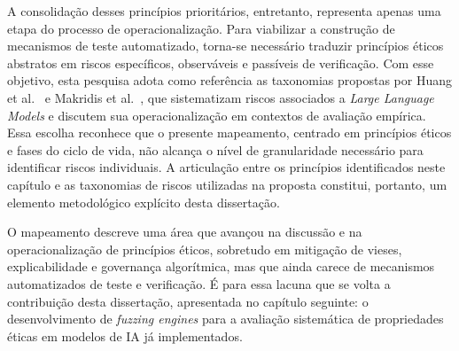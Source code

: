 A consolidação desses princípios prioritários, entretanto, representa apenas uma etapa do processo de operacionalização. Para viabilizar a construção de mecanismos de teste automatizado, torna-se necessário traduzir princípios éticos abstratos em riscos específicos, observáveis e passíveis de verificação. Com esse objetivo, esta pesquisa adota como referência as taxonomias propostas por Huang et al.~\cite{Huang2023} e Makridis et al.~\cite{Makridis2024}, que sistematizam riscos associados a \textit{Large Language Models} e discutem sua operacionalização em contextos de avaliação empírica. Essa escolha reconhece que o presente mapeamento, centrado em princípios éticos e fases do ciclo de vida, não alcança o nível de granularidade necessário para identificar riscos individuais. A articulação entre os princípios identificados neste capítulo e as taxonomias de riscos utilizadas na proposta constitui, portanto, um elemento metodológico explícito desta dissertação.

O mapeamento descreve uma área que avançou na discussão e na operacionalização de princípios éticos, sobretudo em mitigação de vieses, explicabilidade e governança algorítmica, mas que ainda carece de mecanismos automatizados de teste e verificação. É para essa lacuna que se volta a contribuição desta dissertação, apresentada no capítulo seguinte: o desenvolvimento de \textit{fuzzing engines} para a avaliação sistemática de propriedades éticas em modelos de IA já implementados.